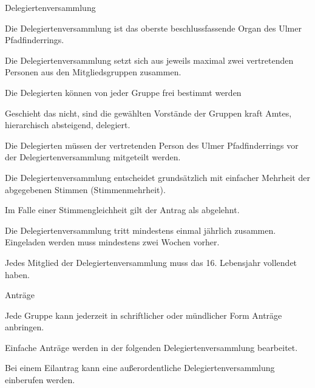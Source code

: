 \begin{legal}
    \item Delegiertenversammlung
        \begin{legal}
            \item Die Delegiertenversammlung ist das oberste beschlussfassende Organ
                  des Ulmer Pfadfinderrings.
            \item Die Delegiertenversammlung setzt sich aus jeweils maximal zwei 
                  vertretenden Personen aus den Mitgliedsgruppen zusammen.
                \begin{legal}
                    \item Die Delegierten können von jeder Gruppe frei bestimmt werden 
                    \item Geschieht das nicht, sind die gewählten Vorstände der Gruppen kraft Amtes, 
                          hierarchisch absteigend, delegiert.
                    \item Die Delegierten müssen der vertretenden Person des Ulmer 
                          Pfadfinderrings vor der Delegiertenversammlung mitgeteilt werden.
                \end{legal}
            \item Die Delegiertenversammlung entscheidet grundsätzlich mit einfacher Mehrheit der 
                  abgegebenen Stimmen (Stimmenmehrheit).
            \item Im Falle einer Stimmengleichheit gilt der Antrag als abgelehnt.
            \item Die Delegiertenversammlung tritt mindestens einmal jährlich zusammen.
                  Eingeladen werden muss mindestens zwei Wochen vorher.
            \item Jedes Mitglied der Delegiertenversammlung muss das 16. Lebensjahr vollendet haben.
            \item Anträge
                \begin{legal}
                    \item Jede Gruppe kann jederzeit in schriftlicher oder mündlicher Form Anträge 
                          anbringen.
                    \item Einfache Anträge werden in der folgenden Delegiertenversammlung 
                          bearbeitet.
                \end{legal}
            \item Bei einem Eilantrag kann eine außerordentliche Delegiertenversammlung 
                  einberufen werden.
                  \begin{legal}

\end{legal}
\end{legal}
\end{legal}
